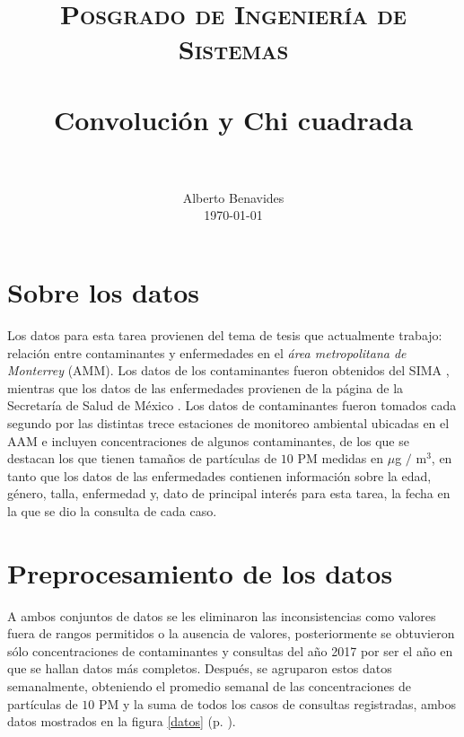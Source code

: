 \documentclass[paper=leter, fontsize=11pt]{scrartcl}
\title{
		\usefont{OT1}{bch}{b}{n}
		\normalfont \normalsize \textsc{Posgrado de Ingeniería de Sistemas} \\ [25pt]
		\horrule{0.5pt} \\[0.4cm]
		\huge Convolución y Chi cuadrada \\
		\horrule{2pt} \\[0.5cm]
}
\author{
		\normalfont 								\normalsize
        Alberto Benavides\\[-3pt]		\normalsize
        \today
}
\date{}
\begin{document}
 
\maketitle

\section{Sobre los datos}
Los datos para esta tarea provienen del tema de tesis que actualmente trabajo: relación entre contaminantes y enfermedades en el \emph{área metropolitana de Monterrey} (AMM). Los datos de los contaminantes fueron obtenidos del SIMA \citep{aireNL}, mientras que los datos de las enfermedades provienen de la página de la Secretaría de Salud de México \citep{egresos}. Los datos de contaminantes fueron tomados cada segundo por las distintas trece estaciones de monitoreo ambiental ubicadas en el AAM e incluyen concentraciones de algunos contaminantes, de los que se destacan los que tienen tamaños de partículas de $10$ PM medidas en $\mu$g $/$ m$^3$, en tanto que los datos de las enfermedades contienen información sobre la edad, género, talla, enfermedad y, dato de principal interés para esta tarea, la fecha en la que se dio la consulta de cada caso.

\section{Preprocesamiento de los datos}
A ambos conjuntos de datos se les eliminaron las inconsistencias como valores fuera de rangos permitidos o la ausencia de valores, posteriormente se obtuvieron sólo concentraciones de contaminantes y consultas del año 2017 por ser el año en que se hallan datos más completos. Después, se agruparon estos datos semanalmente, obteniendo el promedio semanal de las concentraciones de partículas de $10$ PM y la suma de todos los casos de consultas registradas, ambos datos mostrados en la figura \ref{datos} (p. \pageref{datos}).
\end{document}
